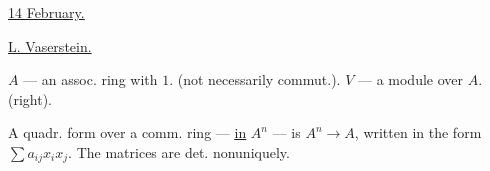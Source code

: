 \underline{\underline{14 February.}}

\underline{L. Vaserstein.}

\begin{flushright}\begingroup\color{black}\endgroup\end{flushright}
$A$ — an assoc. ring with $1$. (not necessarily commut.).
$V$ — a module over $A$. (right).

A quadr. form over a comm. ring — \underline{\underline{in}} $A^n$ — is
$A^n\longrightarrow A$, written in the form $\sum a_{ij}x_ix_j$.
The matrices are det. nonuniquely.

